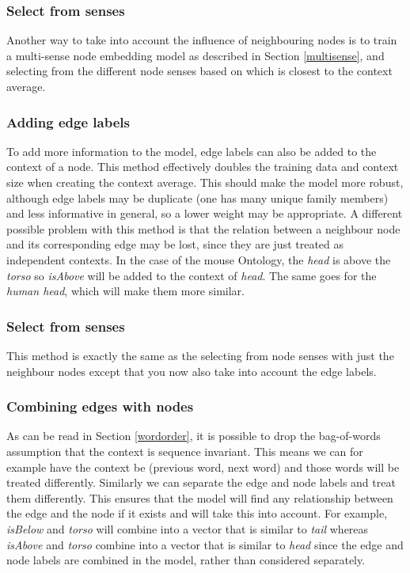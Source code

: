 \documentclass{article}
\begin{document}
  \subsubsection{Select from senses}
  Another way to take into account the influence of neighbouring nodes is to train a multi-sense node embedding model as described in Section \ref{multisense}, and selecting from the different node senses based on which is closest to the context average.
  \subsubsection{Adding edge labels}
  To add more information to the model, edge labels can also be added to the context of a node. This method effectively doubles the training data and context size when creating the context average. This should make the model more robust, although edge labels may be duplicate (one has many unique family members) and less informative in general, so a lower weight may be appropriate. A different possible problem with this method is that the relation between a neighbour node and its corresponding edge may be lost, since they are just treated as independent contexts.
  In the case of the mouse Ontology, the \emph{head} is above the \emph{torso} so \emph{isAbove} will be added to the context of \emph{head}. The same goes for the \emph{human head}, which will make them more similar.
  \subsubsection{Select from senses}
  This method is exactly the same as the selecting from node senses with just the neighbour nodes except that you now also take into account the edge labels.
  \subsubsection{Combining edges with nodes}
  As can be read in Section \ref{wordorder}, it is possible to drop the bag-of-words assumption that the context is sequence invariant.
  This means we can for example have the context be (previous word, next word) and those words will be treated differently. Similarly we can separate the edge and node labels and treat them differently. This ensures that the model will find any relationship between the edge and the node if it exists and will take this into account. For example, \emph{isBelow} and \emph{torso} will combine into a vector that is similar to \emph{tail} whereas \emph{isAbove} and \emph{torso} combine into a vector that is similar to \emph{head} since the edge and node labels are combined in the model, rather than considered separately.
\end{document}
